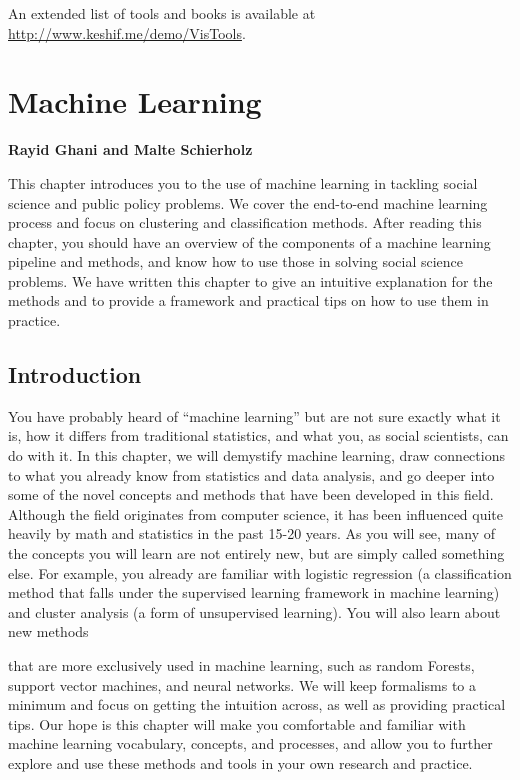 \documentclass[]{krantz}
\begin{document}
An extended list of tools and books is available at
\url{http://www.keshif.me/demo/VisTools}.

\hypertarget{chap:ml}{\chapter{Machine Learning}\label{chap:ml}}

\textbf{Rayid Ghani and Malte Schierholz}

This chapter introduces you to the use of machine learning in tackling
social science and public policy problems. We cover the end-to-end
machine learning process and focus on clustering and classification
methods. After reading this chapter, you should have an overview of the
components of a machine learning pipeline and methods, and know how to
use those in solving social science problems. We have written this
chapter to give an intuitive explanation for the methods and to provide
a framework and practical tips on how to use them in practice.

\section{Introduction}\label{introduction-2}

You have probably heard of ``machine learning'' but are not sure exactly
what it is, how it differs from traditional statistics, and what you, as
social scientists, can do with it. In this chapter, we will demystify
machine learning, draw connections to what you already know from
statistics and data analysis, and go deeper into some of the novel
concepts and methods that have been developed in this field. Although
the field originates from computer science, it has been influenced quite
heavily by math and statistics in the past 15-20 years. As you will see,
many of the concepts you will learn are not entirely new, but are simply
called something else. For example, you already are familiar with
logistic regression (a classification method that falls under the
supervised learning framework in machine learning) and cluster analysis
(a form of unsupervised learning). You will also learn about new methods

that are more exclusively used in machine learning, such as random
Forests, support vector machines, and neural networks. We will keep
formalisms to a minimum and focus on getting the intuition across, as
well as providing practical tips. Our hope is this chapter will make you
comfortable and familiar with machine learning vocabulary, concepts, and
processes, and allow you to further explore and use these methods and
tools in your own research and practice.
\end{document}

